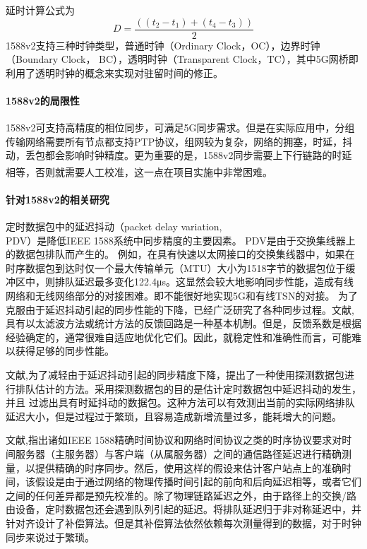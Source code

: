 \documentclass[UTF8,a4paper,12pt]{ctexart}
\numberwithin{equation}{section}
\begin{document}
延时计算公式为
\begin{equation}
	D = \frac{((t_2-t_1)+(t_4-t_3))}{2} 
\end{equation}
1588v2支持三种时钟类型，普通时钟（Ordinary Clock，OC），边界时钟（Boundary Clock， BC），透明时钟（Transparent Clock，TC），其中5G网桥即利用了透明时钟的概念来实现对驻留时间的修正。
\paragraph{1588v2的局限性}
1588v2可支持高精度的相位同步，可满足5G同步需求。但是在实际应用中，分组传输网络需要所有节点都支持PTP协议，组网较为复杂，网络的拥塞，时延，抖动，丢包都会影响时钟精度。更为重要的是，1588v2同步需要上下行链路的时延相等，否则就需要人工校准，这一点在项目实施中非常困难。\textsuperscript{\cite{luling20121588v2}}
\paragraph{针对1588v2的相关研究}

定时数据包中的延迟抖动（packet delay variation,\\PDV）是降低IEEE 1588系统中同步精度的主要因素。 PDV是由于交换集线器上的数据包排队而产生的。 例如，在具有快速以太网接口的交换集线器中，如果在时序数据包到达时仅一个最大传输单元（MTU）大小为1518字节的数据包位于缓冲区中，则排队延迟最多变化122.4μs。这显然会较大地影响同步性能，造成有线网络和无线网络部分的对接困难。即不能很好地实现5G和有线TSN的对接。
为了克服由于延迟抖动引起的同步性能的下降，已经广泛研究了各种同步过程。文献\cite{murakami2009improvement},\cite{subrahmanyan2007implementation}具有以太滤波方法或统计方法的反馈回路是一种基本机制。但是，反馈系数是根据经验确定的，通常很难自适应地优化它们。因此，就稳定性和准确性而言，可能难以获得足够的同步性能。


文献\cite{simanic2011compensation},\cite{lee2011accuracy}为了减轻由于延迟抖动引起的同步精度下降，提出了一种使用探测数据包进行排队估计的方法。采用探测数据包的目的是估计定时数据包中延迟抖动的发生，并且 过滤出具有时延抖动的数据包。这种方法可以有效测出当前的实际网络排队延迟大小，但是过程过于繁琐，且容易造成新增流量过多，能耗增大的问题。


文献\cite{chaloupka2013efficient},\cite{karthik2019optimum}指出诸如IEEE 1588精确时间协议和网络时间协议之类的时序协议要求对时间服务器（主服务器）与客户端（从属服务器）之间的通信路径延迟进行精确测量，以提供精确的时序同步。然后，使用这样的假设来估计客户站点上的准确时间，该假设是由于通过网络的物理传播时间引起的前向和后向延迟相等，或者它们之间的任何差异都是预先校准的。除了物理链路延迟之外，由于路径上的交换/路由设备，定时数据包还会遇到队列引起的延迟。将排队延迟归于非对称延迟中，并针对齐设计了补偿算法。但是其补偿算法依然依赖每次测量得到的数据，对于时钟同步来说过于繁琐。
\end{document}
